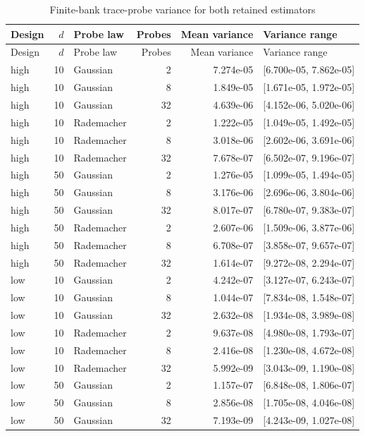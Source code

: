 \begin{longtable}{lrlrrl}
\caption{Finite-bank trace-probe variance for both retained estimators}\label{tab:r16hjbprobes}\\
\toprule
Design & $d$ & Probe law & Probes & Mean variance & Variance range \\
\midrule
\endfirsthead
\toprule
Design & $d$ & Probe law & Probes & Mean variance & Variance range \\
\midrule
\endhead
high & 10 & Gaussian & 2 & 7.274e-05 & [6.700e-05, 7.862e-05] \\
high & 10 & Gaussian & 8 & 1.849e-05 & [1.671e-05, 1.972e-05] \\
high & 10 & Gaussian & 32 & 4.639e-06 & [4.152e-06, 5.020e-06] \\
high & 10 & Rademacher & 2 & 1.222e-05 & [1.049e-05, 1.492e-05] \\
high & 10 & Rademacher & 8 & 3.018e-06 & [2.602e-06, 3.691e-06] \\
high & 10 & Rademacher & 32 & 7.678e-07 & [6.502e-07, 9.196e-07] \\
high & 50 & Gaussian & 2 & 1.276e-05 & [1.099e-05, 1.494e-05] \\
high & 50 & Gaussian & 8 & 3.176e-06 & [2.696e-06, 3.804e-06] \\
high & 50 & Gaussian & 32 & 8.017e-07 & [6.780e-07, 9.383e-07] \\
high & 50 & Rademacher & 2 & 2.607e-06 & [1.509e-06, 3.877e-06] \\
high & 50 & Rademacher & 8 & 6.708e-07 & [3.858e-07, 9.657e-07] \\
high & 50 & Rademacher & 32 & 1.614e-07 & [9.272e-08, 2.294e-07] \\
low & 10 & Gaussian & 2 & 4.242e-07 & [3.127e-07, 6.243e-07] \\
low & 10 & Gaussian & 8 & 1.044e-07 & [7.834e-08, 1.548e-07] \\
low & 10 & Gaussian & 32 & 2.632e-08 & [1.934e-08, 3.989e-08] \\
low & 10 & Rademacher & 2 & 9.637e-08 & [4.980e-08, 1.793e-07] \\
low & 10 & Rademacher & 8 & 2.416e-08 & [1.230e-08, 4.672e-08] \\
low & 10 & Rademacher & 32 & 5.992e-09 & [3.043e-09, 1.190e-08] \\
low & 50 & Gaussian & 2 & 1.157e-07 & [6.848e-08, 1.806e-07] \\
low & 50 & Gaussian & 8 & 2.856e-08 & [1.705e-08, 4.046e-08] \\
low & 50 & Gaussian & 32 & 7.193e-09 & [4.243e-09, 1.027e-08] \\

\end{longtable}
